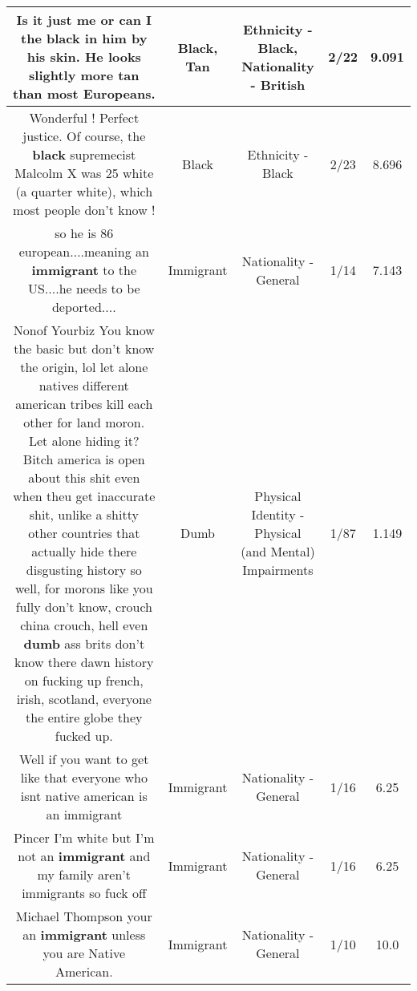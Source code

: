 \documentclass[11pt]{article}
\newlength\mylength
\begin{document}
\begin{center}
\begin{longtable}{|C{.65\mylength}|C{.30\mylength}|C{.12\mylength}|C{.12\mylength}|C{.12\mylength}|}
  \small Is it just me or can I the \textbf{black} in him by his skin. He looks slightly more \textbf{tan} than most Europeans.\normalsize   & Black, Tan & Ethnicity - Black, Nationality - British & 2/22 & 9.091 \\  \hline
  \small Wonderful !   Perfect justice.  Of course, the \textbf{black} supremecist Malcolm X was 25 white (a quarter white), which most people don't know !\normalsize   & Black & Ethnicity - Black & 2/23 & 8.696 \\  \hline
  \small so he is 86 european....meaning an \textbf{immigrant} to the US....he needs to be deported....\normalsize   & Immigrant & Nationality - General & 1/14 & 7.143 \\  \hline
  \small Nonof Yourbiz You know the basic but don't know the origin, lol let alone natives different american tribes kill each other for land moron. Let alone hiding it? Bitch america is  open about this shit even when theu get inaccurate shit, unlike a shitty other countries that actually hide there disgusting history so well, for morons like you fully don't know, crouch china crouch, hell even \textbf{dumb} ass brits don't know there dawn history on fucking up french, irish, scotland, everyone the entire globe they fucked up.\normalsize   & Dumb & Physical Identity - Physical (and Mental) Impairments & 1/87 & 1.149 \\  \hline
  \small Well if you want to get like that everyone who isnt native american is an immigrant\normalsize   & Immigrant & Nationality - General & 1/16 & 6.25 \\  \hline
  \small Pincer I'm white but I'm not an \textbf{immigrant} and my family aren't immigrants so fuck off\normalsize   & Immigrant & Nationality - General & 1/16 & 6.25 \\  \hline
  \small Michael Thompson your an \textbf{immigrant} unless you are Native American.\normalsize   & Immigrant & Nationality - General & 1/10 & 10.0 \\  \hline

\end{longtable}
\end{center}
\end{document}
